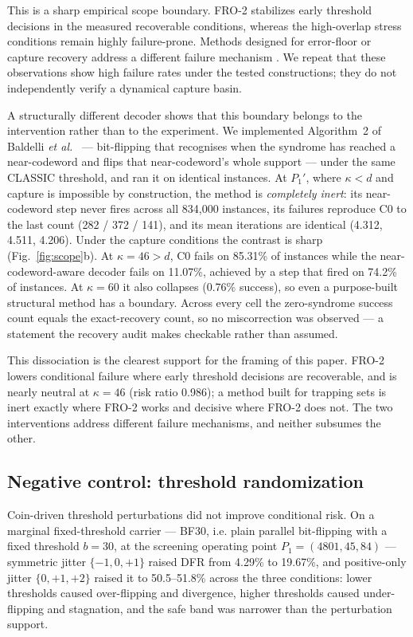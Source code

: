 \documentclass[lettersize,journal]{IEEEtran}
\begin{document}
This is a sharp empirical scope boundary. FRO-2 stabilizes early threshold decisions in the measured recoverable conditions, whereas the high-overlap stress conditions remain highly failure-prone. Methods designed for error-floor or capture recovery address a different failure mechanism \cite{baldelli2026ncw,santini2026flip}. We repeat that these observations show high failure rates under the tested constructions; they do not independently verify a dynamical capture basin.

A structurally different decoder shows that this boundary belongs to the intervention rather than to the experiment. We implemented Algorithm~2 of Baldelli \emph{et al.}~\cite{baldelli2026ncw} --- bit-flipping that recognises when the syndrome has reached a near-codeword and flips that near-codeword's whole support --- under the same CLASSIC threshold, and ran it on identical instances. At $P_1'$, where $\kappa<d$ and capture is impossible by construction, the method is \emph{completely inert}: its near-codeword step never fires across all 834{,}000 instances, its failures reproduce C0 to the last count (282 / 372 / 141), and its mean iterations are identical (4.312, 4.511, 4.206). Under the capture conditions the contrast is sharp (Fig.~\ref{fig:scope}b). At $\kappa=46>d$, C0 fails on 85.31\% of instances while the near-codeword-aware decoder fails on 11.07\%, achieved by a step that fired on 74.2\% of instances. At $\kappa=60$ it also collapses (0.76\% success), so even a purpose-built structural method has a boundary. Across every cell the zero-syndrome success count equals the exact-recovery count, so no miscorrection was observed --- a statement the recovery audit makes checkable rather than assumed.

This dissociation is the clearest support for the framing of this paper. FRO-2 lowers conditional failure where early threshold decisions are recoverable, and is nearly neutral at $\kappa=46$ (risk ratio 0.986); a method built for trapping sets is inert exactly where FRO-2 works and decisive where FRO-2 does not. The two interventions address different failure mechanisms, and neither subsumes the other.

\subsection{Negative control: threshold randomization}\label{sec:negative}

Coin-driven threshold perturbations did not improve conditional risk. On a marginal fixed-threshold carrier --- BF30, i.e. plain parallel bit-flipping with a fixed threshold $b=30$, at the screening operating point $P_1=(4801,45,84)$ --- symmetric jitter $\{-1,0,+1\}$ raised DFR from 4.29\% to 19.67\%, and positive-only jitter $\{0,+1,+2\}$ raised it to 50.5--51.8\% across the three conditions: lower thresholds caused over-flipping and divergence, higher thresholds caused under-flipping and stagnation, and the safe band was narrower than the perturbation support.
\end{document}
